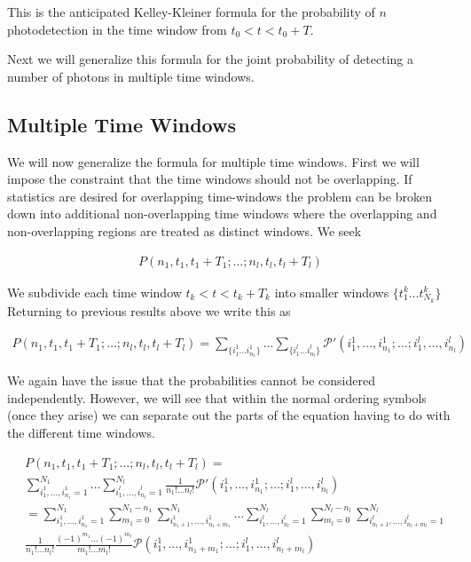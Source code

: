 \documentclass[12pt]{article}
\begin{document}
This is the anticipated Kelley-Kleiner formula for the probability of $n$ photodetection in the time window from $t_0<t<t_0+T$. 

Next we will generalize this formula for the joint probability of detecting a number of photons in multiple time windows.

\subsection{Multiple Time Windows}

We will now generalize the formula for multiple time windows. First we will impose the constraint that the time windows should not be overlapping. If statistics are desired for overlapping time-windows the problem can be broken down into additional non-overlapping time windows where the overlapping and non-overlapping regions are treated as distinct windows. We seek

\begin{align}
P\left(n_1,t_1,t_1+T_1;\ldots ;n_l,t_l,t_l+T_l\right)
\end{align}

We subdivide each time window $t_k<t<t_k+T_k$ into smaller windows $\{t^k_1 \ldots t^k_{N_k} \}$
Returning to previous results above we write this as

\begin{align}
P(n_1,t_1,t_1+T_1;\ldots ;n_l,t_l,t_l+T_l) = \sum_{\{i^1_1 \ldots i^1_{n_1}\}} \ldots \sum_{\{i^l_1 \ldots i^l_{n_l}\}} \mathcal{P}'\left(i^1_1, \ldots ,i^1_{n_1}; \ldots ;i^l_1, \ldots ,i^l_{n_l}\right)
\end{align}

We again have the issue that the probabilities cannot be considered independently. However, we will see that within the normal ordering symbols (once they arise) we can separate out the parts of the equation having to do with the different time windows. 

\begin{align}
&P(n_1,t_1,t_1+T_1;\ldots ;n_l,t_l,t_l+T_l) =\\
&\sum_{i^1_1, \ldots ,i^1_{n_1}=1}^{N_1} \ldots \sum_{i^l_1, \ldots ,i^l_{n_l}=1}^{N_l}\frac{1}{n_1! \ldots n_l!} \mathcal{P}'\left(i^1_1, \ldots ,i^1_{n_1}; \ldots ;i^l_1, \ldots ,i^l_{n_l}\right)\\
&=\sum_{i^1_1, \ldots ,i^1_{n_1}=1}^{N_1} \sum_{m_1=0}^{N_1-n_1} \sum_{i^1_{n_1+1}, \ldots ,i^1_{n_1+m_1}}^{N_1} \ldots \sum_{i^l_1, \ldots ,i^l_{n_l}=1}^{N_l} \sum_{m_l=0}^{N_l-n_l}\sum_{i^l_{n_l+1}, \ldots ,i^l_{n_l+m_l}=1}^{N_l}\\ 
&\frac{1}{n_1! \ldots n_l!}\frac{(-1)^{m_1}\ldots(-1)^{m_l}}{m_1! \ldots m_l!} \mathcal{P}\left(i^1_1, \ldots ,i^1_{n_1+m_1}; \ldots ;i^l_1, \ldots ,i^l_{n_l+m_l}\right)\\
\end{align}
\end{document}
